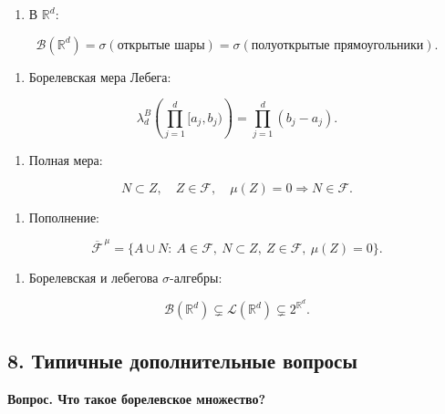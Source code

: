 \documentclass[
  11pt,
  a4paper,
]{article}
\providecommand{\tightlist}{%
  \setlength{\itemsep}{0pt}\setlength{\parskip}{0pt}}
\begin{document}
\begin{enumerate}
\def\labelenumi{\arabic{enumi}.}
\setcounter{enumi}{1}
\tightlist
\item
  В \(\mathbb R^d\):
\end{enumerate}

\[
\mathcal B(\mathbb R^d)
=
\sigma(\text{открытые шары})
=
\sigma(\text{полуоткрытые прямоугольники}).
\]

\begin{enumerate}
\def\labelenumi{\arabic{enumi}.}
\setcounter{enumi}{2}
\tightlist
\item
  Борелевская мера Лебега:
\end{enumerate}

\[
\lambda_d^B\left(\prod_{j=1}^d[a_j,b_j)\right)
=
\prod_{j=1}^d(b_j-a_j).
\]

\begin{enumerate}
\def\labelenumi{\arabic{enumi}.}
\setcounter{enumi}{3}
\tightlist
\item
  Полная мера:
\end{enumerate}

\[
N\subset Z,\quad Z\in\mathcal F,\quad \mu(Z)=0
\Rightarrow
N\in\mathcal F.
\]

\begin{enumerate}
\def\labelenumi{\arabic{enumi}.}
\setcounter{enumi}{4}
\tightlist
\item
  Пополнение:
\end{enumerate}

\[
\overline{\mathcal F}^{\,\mu}
=
\{A\cup N:\ A\in\mathcal F,\ N\subset Z,\ Z\in\mathcal F,\ \mu(Z)=0\}.
\]

\begin{enumerate}
\def\labelenumi{\arabic{enumi}.}
\setcounter{enumi}{5}
\tightlist
\item
  Борелевская и лебегова \(\sigma\)-алгебры:
\end{enumerate}

\[
\mathcal B(\mathbb R^d)\subsetneq\mathcal L(\mathbb R^d)\subsetneq 2^{\mathbb R^d}.
\]

\subsection{8. Типичные дополнительные
вопросы}\label{ux442ux438ux43fux438ux447ux43dux44bux435-ux434ux43eux43fux43eux43bux43dux438ux442ux435ux43bux44cux43dux44bux435-ux432ux43eux43fux440ux43eux441ux44b}

\textbf{Вопрос. Что такое борелевское множество?}
\end{document}
